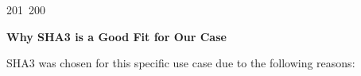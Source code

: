 201~200~\documentclass{article}
\begin{document}
	                                                                                                                                                                                                                                                                                                	                                                                                                                                        	    	                                                                                                	                                                                                                                                                                                                                                                                                                                                	                                                                        	                                                                        	                                                                                                                                        	                                                                        \textbf{Why SHA3 is a Good Fit for Our Case}

	                                                                                                                                                                                                                                                                                                	                                                                                                                                        	    	                                                                                                	                                                                                                                                                                                                                                                                                                                                	                                                                        	                                                                        	                                                                                                                                        	                                                                        SHA3 was chosen for this specific use case due to the following reasons:
\end{document}
